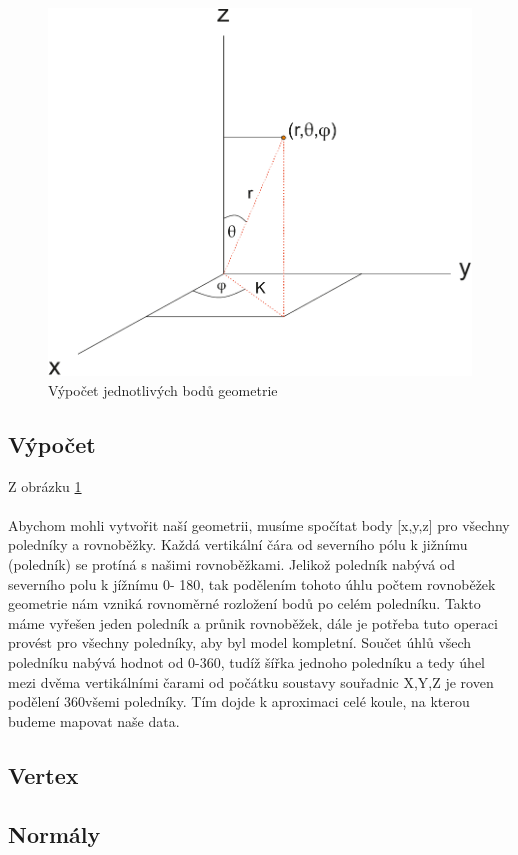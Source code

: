 \begin{figure}[h]
	\label{img:2}
	\centering
	\includegraphics[scale=1.0,angle=0,width=0.8\linewidth]{obrazky-figures/geometry}
	\caption{Výpočet jednotlivých bodů geometrie}
	\label{fig:geom}
\end{figure}
 
\subsection{Výpočet}
Z obrázku \ref{fig:geom} 
\\\\
Abychom mohli vytvořit naší geometrii, musíme spočítat body [x,y,z] pro všechny poledníky a rovnoběžky. Každá vertikální čára od severního pólu k jižnímu (poledník) se protíná s našimi rovnoběžkami. Jelikož poledník nabývá od severního polu k jížnímu 0\degree - 180\degree, tak podělením  tohoto úhlu počtem rovnoběžek geometrie nám vzniká rovnoměrné rozložení bodů po celém poledníku. Takto máme vyřešen jeden poledník a průnik rovnoběžek, dále je potřeba tuto operaci provést pro všechny poledníky, aby byl model kompletní. Součet úhlů všech poledníku nabývá hodnot od   0-360\degree, tudíž šířka jednoho poledníku a tedy úhel mezi dvěma vertikálními čarami od počátku soustavy souřadnic  X,Y,Z je roven podělení  360\degree všemi poledníky.  Tím dojde k aproximaci celé koule, na kterou budeme mapovat naše data.

\subsection{Vertex}
\subsection{Normály}
